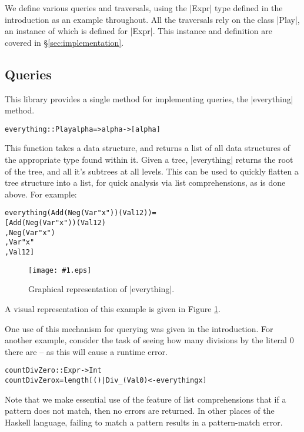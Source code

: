 \documentclass[preprint]{sigplanconf}
\newcommand{\pic}[1]{\texttt{[image: \#1.eps]}}
\newenvironment{code}{\begin{alltt}\small}{\end{alltt}}
\begin{document}
We define various queries and traversals, using the |Expr| type defined in the introduction as an example throughout. All the traversals rely on the class |Play|, an instance of which is defined for |Expr|. This instance and definition are covered in \S\ref{sec:implementation}.

\subsection{Queries}

This library provides a single method for implementing queries, the |everything| method.

\begin{code}
everything :: Play alpha => alpha -> [alpha]
\end{code}

This function takes a data structure, and returns a list of all data structures of the appropriate type found within it. Given a tree, |everything| returns the root of the tree, and all it's subtrees at all levels. This can be used to quickly flatten a tree structure into a list, for quick analysis via list comprehensions, as is done above. For example:

\begin{code}
everything (Add (Neg (Var "x")) (Val 12)) =
    [Add (Neg (Var "x")) (Val 12)
    ,Neg (Var "x")
    ,Var "x"
    ,Val 12]
\end{code}

\begin{figure}
\pic{everything2}
\caption{Graphical representation of |everything|.}
\label{fig:everything}
\end{figure}

A visual representation of this example is given in Figure \ref{fig:everything}.

One use of this mechanism for querying was given in the introduction. For another example, consider the task of seeing how many divisions by the literal 0 there are -- as this will cause a runtime error.

\begin{code}
countDivZero :: Expr -> Int
countDivZero x = length [() | Div _ (Val 0) <- everything x]
\end{code}

Note that we make essential use of the feature of list comprehensions that if a pattern does not match, then no errors are returned. In other places of the Haskell language, failing to match a pattern results in a pattern-match error.
\end{document}
